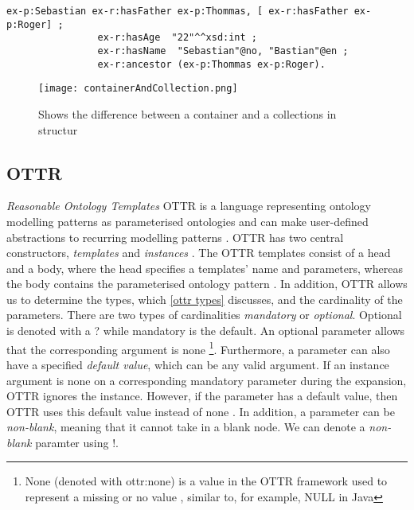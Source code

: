 \begin{lstlisting}[frame=single, language=turtle]
ex-p:Sebastian ex-r:hasFather ex-p:Thommas, [ ex-r:hasFather ex-p:Roger] ; 
                ex-r:hasAge  "22"^^xsd:int ; 
                ex-r:hasName  "Sebastian"@no, "Bastian"@en ;
                ex-r:ancestor (ex-p:Thommas ex-p:Roger).
\end{lstlisting}

\begin{figure}
    \centering
    \texttt{[image: containerAndCollection.png]}
    \caption{Shows the difference between a container and a collections in structur}
    \label{fig:containerAndCollection}
\end{figure}

\subsection{OTTR}
\emph{Reasonable Ontology Templates} OTTR is a language representing ontology modelling patterns as parameterised ontologies and can make user-defined abstractions to recurring modelling patterns \autocite[477]{SLKF_OTTR_2018}. OTTR has two central constructors, \emph{templates} and \emph{instances} \autocite[3]{SLKK_OTTR_2021}. The OTTR  templates consist of a head and a body, where the head specifies a templates' name and parameters, whereas the body contains the parameterised ontology pattern \autocite[479]{SLKF_OTTR_2018}. In addition, OTTR allows us to determine the types, which \autoref{ottr types} discusses, and the cardinality of the parameters. There are two types of cardinalities \emph{mandatory} or \emph{optional}. Optional is denoted with a ? while mandatory is the default. An optional parameter allows that the corresponding argument is none \footnote{None (denoted with ottr:none) is a value in the OTTR framework used to represent a missing or no value \autocite[7]{SLKK_OTTR_2021}, similar to, for example, NULL in Java}. Furthermore, a parameter can also have a specified \emph{default value}, which can be any valid argument. If an instance argument is none on a corresponding mandatory parameter during the expansion, OTTR ignores the instance\autocite[480]{SLKF_OTTR_2018}. However, if the parameter has a default value, then OTTR uses this default value instead of none \autocite[7]{SLKK_OTTR_2021}. In addition, a parameter can be \emph{non-blank}, meaning that it cannot take in a blank node. We can denote a \emph{non-blank} paramter using !\autocite[6]{SLKK_OTTR_2021}.

